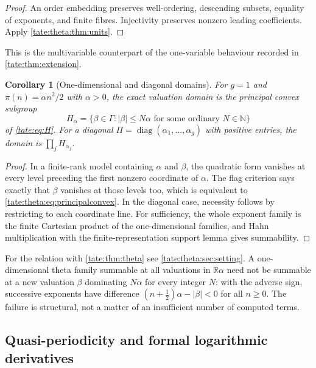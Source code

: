 \documentclass[11pt,letterpaper]{article}
\newtheorem{corollary}[corollary]{Corollary}
\theoremstyle{definition}
\newcommand{\R}{\mathbb R}
\newcommand{\N}{\mathbb N}
\begin{document}
\begin{proof}
An order embedding preserves well-ordering, descending subsets, equality of
exponents, and finite fibres. Injectivity preserves nonzero leading
coefficients. Apply \cref{tate:theta:thm:units}.
\end{proof}

This is the multivariable counterpart of the one-variable behaviour recorded
in \cref{tate:thm:extension}.

\begin{corollary}[One-dimensional and diagonal domains]\label{tate:theta:cor:rankone}
For $g=1$ and $\pi(n)=\alpha n^2/2$ with $\alpha>0$, the exact valuation
domain is the principal convex subgroup
\begin{equation}
 H_\alpha=\{\beta\in\Gamma:|\beta|\le N\alpha
                  \text{ for some ordinary }N\in\N\}
 \label{tate:theta:eq:principalconvex}
\end{equation}
of \eqref{tate:eq:H}. For a diagonal $\Pi=\operatorname{diag}(\alpha_1,\ldots,\alpha_g)$
with positive entries, the domain is $\prod_jH_{\alpha_j}$.
\end{corollary}

\begin{proof}
In a finite-rank model containing $\alpha$ and $\beta$, the quadratic form
vanishes at every level preceding the first nonzero coordinate of $\alpha$.
The flag criterion says exactly that $\beta$ vanishes at those levels too,
which is equivalent to \eqref{tate:theta:eq:principalconvex}. In the
diagonal case, necessity follows by restricting to each coordinate line.
For sufficiency, the whole exponent family is the finite Cartesian product
of the one-dimensional families, and Hahn multiplication with the
finite-representation support lemma gives summability.
\end{proof}

For the relation with \cref{tate:thm:theta} see
\cref{tate:theta:sec:setting}. A one-dimensional theta family summable at
all valuations in $\R\alpha$ need not be summable at a new valuation
$\beta$ dominating $N\alpha$ for every integer $N$: with the adverse sign,
successive exponents have difference $(n+\tfrac12)\alpha-|\beta|<0$ for
all $n\ge0$. The failure is structural, not a matter of an insufficient
number of computed terms.

\subsection{Quasi-periodicity and formal logarithmic derivatives}
\end{document}
